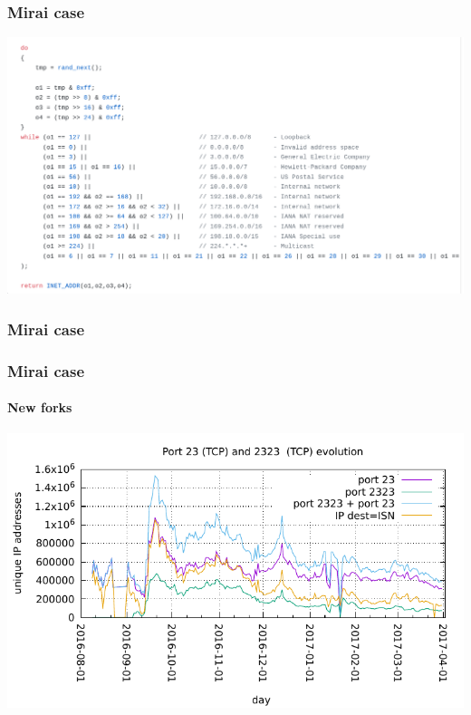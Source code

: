 \documentclass{beamer}
\begin{document}
\begin{frame}
\frametitle{Mirai case}
\includegraphics[scale=0.3]{scanner.png}
\end{frame}
\begin{frame}
    \frametitle{Mirai case}
    \scalebox{0.8}{}
\end{frame}

\begin{frame}
\frametitle{Mirai case}
\framesubtitle{New forks}
\begin{center}
    \includegraphics[scale=0.8]{prop.pdf}
\end{center}

\end{frame}
\end{document}
